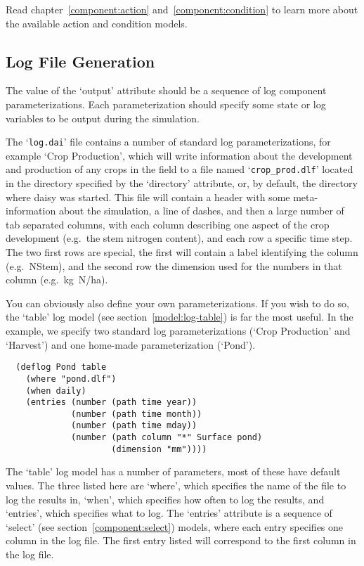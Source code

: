 Read chapter~\ref{component:action} and~\ref{component:condition} to
learn more about the available action and condition models.

\subsection{Log File Generation}

The value of the `output' attribute should be a sequence of log
component parameterizations.  Each parameterization should specify
some state or log variables to be output during the simulation.

The `\texttt{log.dai}' file contains a number of standard log
parameterizations, for example `Crop Production', which will write
information about the development and production of any crops in the
field to a file named `\texttt{crop\_prod.dlf}' located in the
directory specified by the `directory' attribute, or, by default, the
directory where daisy was started.  This file will contain a header
with some meta-information about the simulation, a line of dashes, and
then a large number of tab separated columns, with each column
describing one aspect of the crop development (e.g.\ the stem nitrogen
content), and each row a specific time step.  The two first rows are
special, the first will contain a label identifying the column (e.g.\ 
NStem), and the second row the dimension used for the numbers in that
column (e.g.\ kg~N/ha).

You can obviously also define your own parameterizations.  If you wish
to do so, the `table' log model (see section~\ref{model:log-table})
is far the most useful.  In the example, we specify two standard log
parameterizations (`Crop Production' and `Harvest') and one home-made
parameterization (`Pond').

\begin{verbatim}
  (deflog Pond table
    (where "pond.dlf")
    (when daily)
    (entries (number (path time year))
             (number (path time month))
             (number (path time mday))
             (number (path column "*" Surface pond)
                     (dimension "mm"))))
\end{verbatim}

The `table' log model has a number of parameters, most of these have
default values.  The three listed here are `where', which specifies
the name of the file to log the results in, `when', which specifies
how often to log the results, and `entries', which specifies what to
log.  The `entries' attribute is a sequence of `select' (see
section~\ref{component:select}) models, where each entry specifies one
column in the log file.  The first entry listed will correspond to the
first column in the log file.


